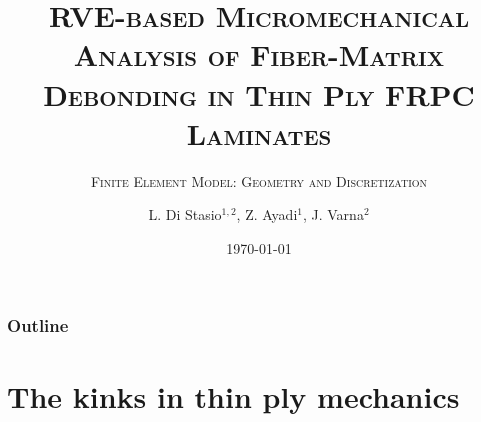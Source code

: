 \documentclass[first,firstsupp,lastsupp,handout,last,hyperref,table]{ETHclass}
\makeatletter
\newenvironment{withoutheadline}{
         \setbeamertemplate{headline}{%
\vspace{35pt}
}
    }{}
\makeatother
\begin{document}

\title{\textsc{RVE-based Micromechanical Analysis of Fiber-Matrix Debonding in Thin Ply FRPC Laminates}}
\subtitle{\textsc{Finite Element Model: Geometry and Discretization}}
\author{ L. Di Stasio$^{1,2}$, Z. Ayadi$^{1}$, J. Varna$^{2}$}
\date{\today}

\begin{frame}[plain]
    \titlepage
\end{frame}

\begin{withoutheadline}
\begin{frame}
\frametitle{Outline}
\justifying
\vspace*{-0.5cm}
\tableofcontents[hidesubsections]
\end{frame}
\end{withoutheadline}



\section[Thin ply mechanics]{The kinks in thin ply mechanics}
\end{document}
